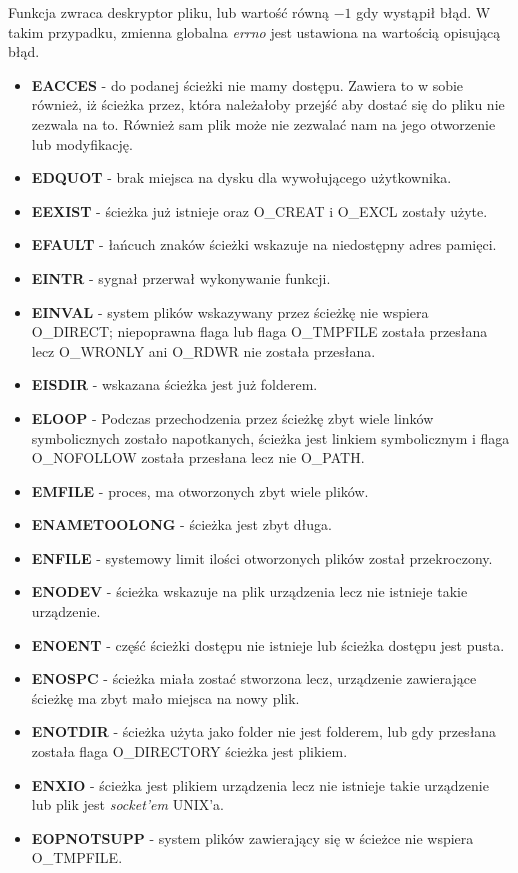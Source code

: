 \documentclass{article}
\begin{document}
Funkcja zwraca deskryptor pliku, lub wartość równą $-1$ gdy wystąpił błąd.
W takim przypadku, zmienna globalna \textit{errno} jest ustawiona na wartością opisującą błąd.
\begin{itemize}
\item \textbf{EACCES} - do podanej ścieżki nie mamy dostępu. Zawiera to w sobie również,
iż ścieżka przez, która należałoby przejść aby dostać się do pliku nie zezwala na to.
Również sam plik może nie zezwalać nam na jego otworzenie lub modyfikację.
\item \textbf{EDQUOT} - brak miejsca na dysku dla wywołującego użytkownika.
\item \textbf{EEXIST} - ścieżka już istnieje oraz O\_CREAT i O\_EXCL zostały użyte.
\item \textbf{EFAULT} - łańcuch znaków ścieżki wskazuje na niedostępny adres pamięci.
\item \textbf{EINTR} - sygnał przerwał wykonywanie funkcji.
\item \textbf{EINVAL} - system plików wskazywany przez ścieżkę nie wspiera O\_DIRECT;
	niepoprawna flaga lub flaga O\_TMPFILE została przesłana lecz O\_WRONLY ani
	O\_RDWR nie została przesłana.
\item \textbf{EISDIR} - wskazana ścieżka jest już folderem.
\item \textbf{ELOOP} - Podczas przechodzenia przez ścieżkę zbyt wiele linków symbolicznych zostało napotkanych, ścieżka jest linkiem symbolicznym i flaga O\_NOFOLLOW została przesłana
	lecz nie O\_PATH.
\item \textbf{EMFILE} - proces, ma otworzonych zbyt wiele plików.
\item \textbf{ENAMETOOLONG} - ścieżka jest zbyt długa.
\item \textbf{ENFILE} - systemowy limit ilości otworzonych plików został przekroczony.
\item \textbf{ENODEV} - ścieżka wskazuje na plik urządzenia lecz nie istnieje takie urządzenie.
\item \textbf{ENOENT} - część ścieżki dostępu nie istnieje lub ścieżka dostępu jest pusta.
\item \textbf{ENOSPC} - ścieżka miała zostać stworzona lecz, urządzenie zawierające ścieżkę ma zbyt mało miejsca na nowy plik.
\item \textbf{ENOTDIR} - ścieżka użyta jako folder nie jest folderem, lub gdy przesłana została flaga O\_DIRECTORY ścieżka jest plikiem.
\item \textbf{ENXIO} - ścieżka jest plikiem urządzenia lecz nie istnieje takie urządzenie lub plik jest \textit{socket'em} UNIX'a.
\item \textbf{EOPNOTSUPP} - system plików zawierający się w ścieżce nie wspiera O\_TMPFILE.
\end{itemize}
\end{document}
